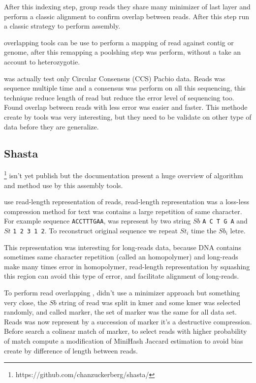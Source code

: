 \documentclass[main]{subfiles}
\begin{document}
After this indexing step, \shimmer group reads they share many minimizer of last layer and perform a classic alignment to confirm overlap between reads. After this step \peregrine run a classic \OLC strategy to perform assembly.

\shimmer overlapping tools can be use to perform a mapping of read against contig or genome, after this remapping a poolshing step was perform, without a take an account to heterozygotie.

\peregrine was actually test only Circular Consensus (CCS) Pacbio data. Reads was sequence multiple time and a consensus was perform on all this sequencing, this technique reduce length of read but reduce the error level of sequencing too. Found overlap between reads with less error was easier and faster. This methode create by \peregrine tools was very interesting, but they need to be validate on other type of data before they are generalize.

\subsection{Shasta}

\newcommand{\shasta}{}

\shasta\footnote{https://github.com/chanzuckerberg/shasta/} isn't yet publish but the documentation present a huge overview of algorithm and method use by this assembly tools.

\shasta use read-length representation of reads, read-length representation was a loss-less compression method for text was contains a large repetition of same character. For example sequence \texttt{ACCTTTGAA}, was represent by two string $Sb$ \texttt{A C T G A} and $St$ \texttt{1 2 3 1 2}. To reconstruct original sequence we repeat $St_i$ time the $Sb_i$ letre.

This representation was interesting for long-reads data, because DNA contains sometimes same character repetition (called an homopolymer) and long-reads make many times error in homopolymer, read-length representation by squashing this region can avoid this type of error, and facilitate alignment of long-reads.

To perform read overlapping \shasta, didn't use a minimizer approach but something very close, the $Sb$ string of read was split in kmer and some kmer was selected randomly, and called marker, the set of marker was the same for all data set. Reads was now represent by a succession of marker it's a destructive compression.
Before search a colinear match of marker, to select reads with higher probability of match \shasta compute a modification of MiniHash Jaccard estimation to avoid bias create by difference of length between reads.
\end{document}

